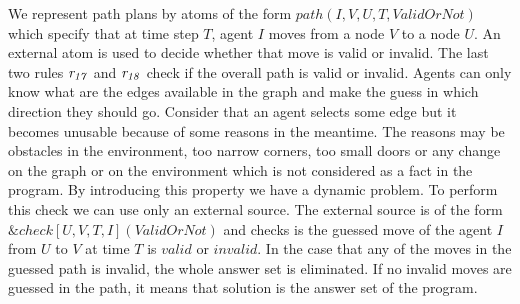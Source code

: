 \documentclass[a4paper, titlepage]{article}
\newcommand{\ext}[3]{\ensuremath{\&{#1}[#2](#3)}}
\newcommand{\row}[1]{%
  \ensuremath{\it \color{black} #1 \color{black}}%
}
\begin{document}
We represent path plans by atoms of the form 
$\mathit{path(I, V, U, T, ValidOrNot)}$ which specify that 
at time step $T$, agent $I$ moves from a node $V$ to a 
node $U$. An external atom is used to decide whether that move is valid or invalid. The last 
two rules $\row{r_{17}}$ and $\row{r_{18}}$ check if the overall path is valid or invalid. Agents can only know what are the edges 
available in the graph and make the guess in which 
direction they should go. Consider that an agent selects 
some 
edge but it becomes unusable because of some reasons in the meantime. 
The reasons may be obstacles in the environment, too narrow corners, too small doors or any change on 
the graph or on the environment which is not considered as 
a fact in the program. By introducing this property we have a dynamic problem. To perform this check we 
can use only an external source. The external source is of the 
form \ext{check}{U,V,T,I}{ValidOrNot} and checks is the 
guessed move of the agent $I$ from $U$ to $V$ at time $T$ is 
$\mathit{valid}$ or $\mathit{invalid}$. In the case that 
any of the moves in the guessed path is invalid, the whole 
answer set is eliminated. If no invalid moves are guessed in the path, it means that solution is the answer set of the program.            
\end{document}
